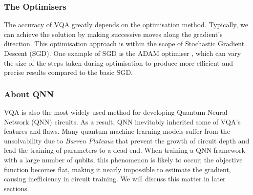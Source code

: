 \subsubsection{The Optimisers}
The accuracy of VQA greatly depends on the optimisation method.
Typically, we can achieve the solution by making successive moves along the gradient's direction.
This optimisation approach is within the scope of Stochastic Gradient Descent (SGD).
One example of SGD is the ADAM optimiser \cite{kingmaAdamMethodStochastic2014}, which can vary the size of the steps taken during optimisation to produce more efficient and precise results compared to the basic SGD.


\subsubsection{About QNN}
VQA is also the most widely used method for developing Quantum Neural Network (QNN) circuits. 
As a result, QNN inevitably inherited some of VQA's features and flaws.
Many quantum machine learning models suffer from the unsolvability due to \textit{Barren Plateaus} \cite{zhaoReviewQuantumNeural2021} that prevent the growth of circuit depth and lead the training of parameters to a dead end.
When training a QNN framework with a large number of qubits, this phenomenon is likely to occur; the objective function becomes flat, making it nearly impossible to estimate the gradient, \cite{mccleanBarrenPlateausQuantum2018, zhaoAnalyzingBarrenPlateau2021} causing inefficiency in circuit training. 
We will discuss this matter in later sections.



